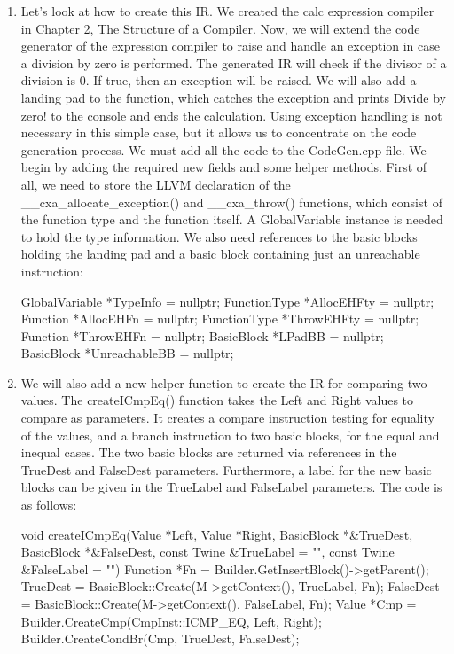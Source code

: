\begin{enumerate}
\item
Let’s look at how to create this IR. We created the calc expression compiler in Chapter 2, The Structure of a Compiler. Now, we will extend the code generator of the expression compiler to raise and handle an exception in case a division by zero is performed. The generated IR will check if the divisor of a division is 0. If true, then an exception will be raised. We will also add a landing pad to the function, which catches the exception and prints Divide by zero! to the console and ends the calculation. Using exception handling is not necessary in this simple case, but it allows us to concentrate on the code generation process. We must add all the code to the CodeGen.cpp file. We begin by adding the required new fields and some helper methods. First of all, we need to store the LLVM declaration of the \_\_cxa\_allocate\_exception() and \_\_cxa\_throw() functions, which consist of the function type and the function itself. A GlobalVariable instance is needed to hold the type information. We also need references to the basic blocks holding the landing pad and a basic block containing just an unreachable instruction:

\begin{cpp}
GlobalVariable *TypeInfo = nullptr;
FunctionType *AllocEHFty = nullptr;
Function *AllocEHFn = nullptr;
FunctionType *ThrowEHFty = nullptr;
Function *ThrowEHFn = nullptr;
BasicBlock *LPadBB = nullptr;
BasicBlock *UnreachableBB = nullptr;
\end{cpp}

\item
We will also add a new helper function to create the IR for comparing two values. The createICmpEq() function takes the Left and Right values to compare as parameters. It creates a compare instruction testing for equality of the values, and a branch instruction to two basic blocks, for the equal and inequal cases. The two basic blocks are returned via references in the TrueDest and FalseDest parameters. Furthermore, a label for the new basic blocks can be given in the TrueLabel and FalseLabel parameters. The code is as follows:

\begin{cpp}
void createICmpEq(Value *Left, Value *Right,
                    BasicBlock *&TrueDest,
                    BasicBlock *&FalseDest,
                    const Twine &TrueLabel = "",
                    const Twine &FalseLabel = "") {
    Function *Fn =
        Builder.GetInsertBlock()->getParent();
    TrueDest = BasicBlock::Create(M->getContext(),
                                    TrueLabel, Fn);
    FalseDest = BasicBlock::Create(M->getContext(),
                                    FalseLabel, Fn);
    Value *Cmp = Builder.CreateCmp(CmpInst::ICMP_EQ,
                                    Left, Right);
    Builder.CreateCondBr(Cmp, TrueDest, FalseDest);
}
\end{cpp}


\end{enumerate}
